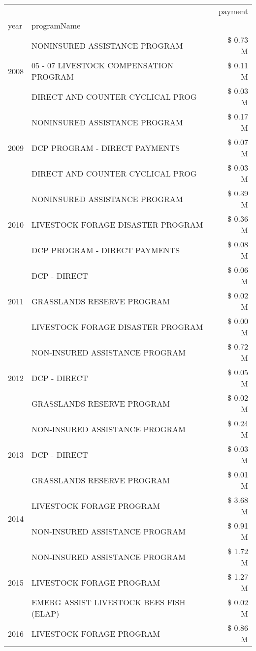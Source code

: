 \begin{tabular}{llr}
\toprule
 &  & payment \\
year & programName &  \\
\midrule
\multirow[t]{3}{*}{2008} & NONINSURED ASSISTANCE PROGRAM & \$ 0.73 M \\
 & 05 - 07 LIVESTOCK COMPENSATION PROGRAM & \$ 0.11 M \\
 & DIRECT AND COUNTER CYCLICAL PROG & \$ 0.03 M \\
\cline{1-3}
\multirow[t]{3}{*}{2009} & NONINSURED ASSISTANCE PROGRAM & \$ 0.17 M \\
 & DCP PROGRAM - DIRECT PAYMENTS & \$ 0.07 M \\
 & DIRECT AND COUNTER CYCLICAL PROG & \$ 0.03 M \\
\cline{1-3}
\multirow[t]{3}{*}{2010} & NONINSURED ASSISTANCE PROGRAM & \$ 0.39 M \\
 & LIVESTOCK FORAGE DISASTER  PROGRAM & \$ 0.36 M \\
 & DCP PROGRAM - DIRECT PAYMENTS & \$ 0.08 M \\
\cline{1-3}
\multirow[t]{3}{*}{2011} & DCP - DIRECT & \$ 0.06 M \\
 & GRASSLANDS RESERVE PROGRAM & \$ 0.02 M \\
 & LIVESTOCK FORAGE DISASTER PROGRAM & \$ 0.00 M \\
\cline{1-3}
\multirow[t]{3}{*}{2012} & NON-INSURED ASSISTANCE PROGRAM & \$ 0.72 M \\
 & DCP - DIRECT & \$ 0.05 M \\
 & GRASSLANDS RESERVE PROGRAM & \$ 0.02 M \\
\cline{1-3}
\multirow[t]{3}{*}{2013} & NON-INSURED ASSISTANCE PROGRAM & \$ 0.24 M \\
 & DCP - DIRECT & \$ 0.03 M \\
 & GRASSLANDS RESERVE PROGRAM & \$ 0.01 M \\
\cline{1-3}
\multirow[t]{2}{*}{2014} & LIVESTOCK FORAGE PROGRAM & \$ 3.68 M \\
 & NON-INSURED ASSISTANCE PROGRAM & \$ 0.91 M \\
\cline{1-3}
\multirow[t]{3}{*}{2015} & NON-INSURED ASSISTANCE PROGRAM & \$ 1.72 M \\
 & LIVESTOCK FORAGE PROGRAM & \$ 1.27 M \\
 & EMERG ASSIST LIVESTOCK BEES FISH (ELAP) & \$ 0.02 M \\
\cline{1-3}
\multirow[t]{3}{*}{2016} & LIVESTOCK FORAGE PROGRAM                      & \$ 0.86 M \\

\end{tabular}
